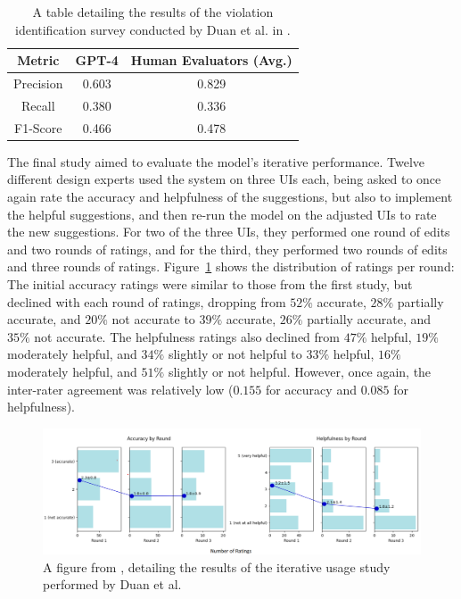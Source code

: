 \documentclass[11pt,titlepage,oneside,openany]{book}
\begin{document}
\begin{table}
	\centering
	\begin{tabular}{|ccc|}
		\hline
		\textbf{Metric} & \textbf{GPT-4} & \textbf{Human Evaluators (Avg.)} \\ \hline
		Precision       & 0.603          & 0.829                            \\ \hline
		Recall          & 0.380          & 0.336                              \\ \hline
		F1-Score        & 0.466          & 0.478                            \\ \hline
	\end{tabular}
	\caption{A table detailing the results of the violation identification survey conducted by Duan et al. in \cite{duan_generating_2024}.}
	\label{tab:duan}
\end{table}

The final study aimed to evaluate the model's iterative performance. Twelve different design experts used the system on three UIs each, being asked to once again rate the accuracy and helpfulness of the suggestions, but also to implement the helpful suggestions, and then re-run the model on the adjusted UIs to rate the new suggestions. For two of the three UIs, they performed one round of edits and two rounds of ratings, and for the third, they performed two rounds of edits and three rounds of ratings. Figure~\ref{fig:duan_iter} shows the distribution of ratings per round: The initial accuracy ratings were similar to those from the first study, but declined with each round of ratings, dropping from $52\%$ accurate, $28\%$ partially accurate, and $20\%$ not accurate to $39\%$ accurate, $26\%$ partially accurate, and $35\%$ not accurate. The helpfulness ratings also declined from $47\%$ helpful, $19\%$ moderately helpful, and $34\%$ slightly or not helpful to $33\%$ helpful, $16\%$ moderately helpful, and $51\%$ slightly or not helpful. However, once again, the inter-rater agreement was relatively low ($0.155$ for accuracy and $0.085$ for helpfulness). 

\begin{figure}[H]
	\centering
	\includegraphics[width=\textwidth]{figures/duan_iterative.png}
	\caption{A figure from \cite{duan_generating_2024}, detailing the results of the iterative usage study performed by Duan et al.}
	\label{fig:duan_iter}
\end{figure}
\end{document}

